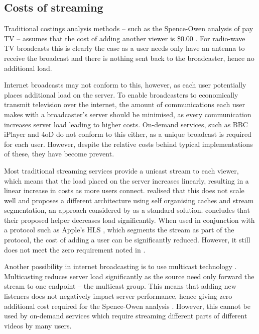 \subsection{Costs of streaming}

	Traditional costings analysis methods -- such as the Spence-Owen analysis of pay TV -- assumes that the cost of adding another viewer is \$0.00 \citet{broadcastEconomics}. For radio-wave TV broadcasts this is clearly the case as a user needs only have an antenna to receive the broadcast and there is nothing sent back to the broadcaster, hence no additional load. 

	Internet broadcasts may not conform to this, however, as each user potentially places additional load on the server. To enable broadcasters to economically transmit television over the internet, the amount of communications each user makes with a broadcaster's server should be minimised, as every communication increases server load leading to higher costs. On-demand services, such as BBC iPlayer and 4oD do not conform to this either, as a unique broadcast is required for each user. However, despite the relative costs behind typical implementations of these, they have become prevent.

	Most traditional streaming services provide a unicast stream to each viewer, which means that the load placed on the server increases linearly, resulting in a linear increase in costs as more users connect. \citet{cachedStream} realised that this does not scale well and proposes a different architecture using self organising caches and stream segmentation, an approach considered by \citet{segmentProxyCaching} as a standard solution. \citet{cachedStream} concludes that their proposed helper decreases load significantly. When used in conjunction with a protocol such as Apple's HLS \cite{HLS}, which segments the stream as part of the protocol, the cost of adding a user can be significantly reduced. However, it still does not meet the zero requirement noted in \citet{broadcastEconomics}.

	Another possibility in internet broadcasting is to use multicast technology \citep{multicast}. Multicasting reduces server load significantly as the source need only forward the stream to one endpoint -- the multicast group. This means that adding new listeners does not negatively impact server performance, hence giving zero additional cost required for the Spence-Owen analysis \citep{broadcastEconomics}. However, this cannot be used by on-demand services which require streaming different parts of different videos by many users.
